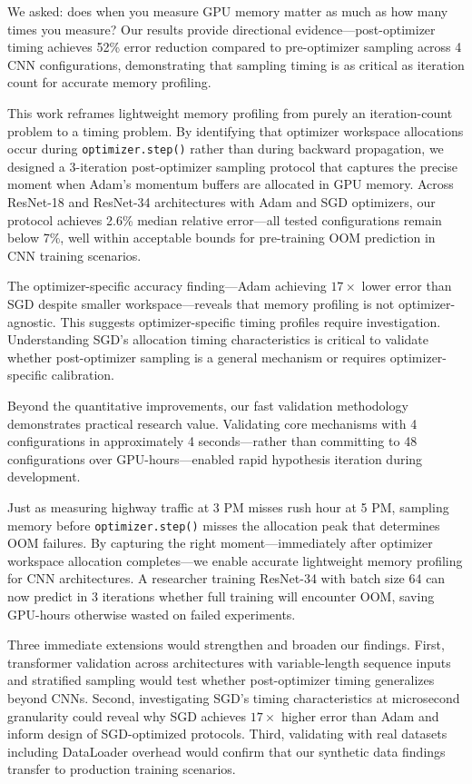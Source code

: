 
We asked: does when you measure GPU memory matter as much as how many times you measure? Our results provide directional evidence---post-optimizer timing achieves 52\% error reduction compared to pre-optimizer sampling across 4 CNN configurations, demonstrating that sampling timing is as critical as iteration count for accurate memory profiling.

This work reframes lightweight memory profiling from purely an iteration-count problem to a timing problem. By identifying that optimizer workspace allocations occur during \texttt{optimizer.step()} rather than during backward propagation, we designed a 3-iteration post-optimizer sampling protocol that captures the precise moment when Adam's momentum buffers are allocated in GPU memory. Across ResNet-18 and ResNet-34 architectures with Adam and SGD optimizers, our protocol achieves 2.6\% median relative error---all tested configurations remain below 7\%, well within acceptable bounds for pre-training OOM prediction in CNN training scenarios.

The optimizer-specific accuracy finding---Adam achieving $17\times$ lower error than SGD despite smaller workspace---reveals that memory profiling is not optimizer-agnostic. This suggests optimizer-specific timing profiles require investigation. Understanding SGD's allocation timing characteristics is critical to validate whether post-optimizer sampling is a general mechanism or requires optimizer-specific calibration.

Beyond the quantitative improvements, our fast validation methodology demonstrates practical research value. Validating core mechanisms with 4 configurations in approximately 4 seconds---rather than committing to 48 configurations over GPU-hours---enabled rapid hypothesis iteration during development.

Just as measuring highway traffic at 3 PM misses rush hour at 5 PM, sampling memory before \texttt{optimizer.step()} misses the allocation peak that determines OOM failures. By capturing the right moment---immediately after optimizer workspace allocation completes---we enable accurate lightweight memory profiling for CNN architectures. A researcher training ResNet-34 with batch size 64 can now predict in 3 iterations whether full training will encounter OOM, saving GPU-hours otherwise wasted on failed experiments.

Three immediate extensions would strengthen and broaden our findings. First, transformer validation across architectures with variable-length sequence inputs and stratified sampling would test whether post-optimizer timing generalizes beyond CNNs. Second, investigating SGD's timing characteristics at microsecond granularity could reveal why SGD achieves $17\times$ higher error than Adam and inform design of SGD-optimized protocols. Third, validating with real datasets including DataLoader overhead would confirm that our synthetic data findings transfer to production training scenarios.


